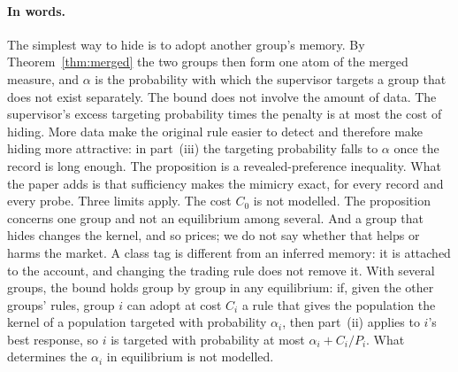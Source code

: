 \paragraph{In words.} The simplest way to hide is to adopt another group's memory. By Theorem~\ref{thm:merged} the two groups then form one atom of the merged measure, and $\alpha$ is the probability with which the supervisor targets a group that does not exist separately. The bound does not involve the amount of data. The supervisor's excess targeting probability times the penalty is at most the cost of hiding. More data make the original rule easier to detect and therefore make hiding more attractive: in part~(iii) the targeting probability falls to $\alpha$ once the record is long enough. The proposition is a revealed-preference inequality. What the paper adds is that sufficiency makes the mimicry exact, for every record and every probe. Three limits apply. The cost $C_0$ is not modelled. The proposition concerns one group and not an equilibrium among several. And a group that hides changes the kernel, and so prices; we do not say whether that helps or harms the market. A class tag is different from an inferred memory: it is attached to the account, and changing the trading rule does not remove it. With several groups, the bound holds group by group in any equilibrium: if, given the other groups' rules, group $i$ can adopt at cost $C_i$ a rule that gives the population the kernel of a population targeted with probability $\alpha_i$, then part~(ii) applies to $i$'s best response, so $i$ is targeted with probability at most $\alpha_i+C_i/P_i$. What determines the $\alpha_i$ in equilibrium is not modelled.

